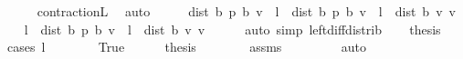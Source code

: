 \begin{isabellebody}
\ \ \ \ \isamarkupfalse%
\ contraction{\isacharunderscore}{\kern0pt}L\ \isamarkupfalse%
\ auto\isanewline
\ \ \isamarkupfalse%
\ \isamarkupfalse%
\ {\isachardoublequoteopen}dist\ {\isacharparenleft}{\kern0pt}{\isasymnu}\isactrlsub b\ {\isacharquery}{\kern0pt}p{\isacharparenright}{\kern0pt}\ {\isacharparenleft}{\kern0pt}{\isasymL}\isactrlsub b\ {\isacharquery}{\kern0pt}v{\isacharparenright}{\kern0pt}\ {\isasymle}\ l\ {\isacharasterisk}{\kern0pt}\ dist\ {\isacharparenleft}{\kern0pt}{\isasymnu}\isactrlsub b\ {\isacharquery}{\kern0pt}p{\isacharparenright}{\kern0pt}\ {\isacharparenleft}{\kern0pt}{\isasymL}\isactrlsub b\ {\isacharquery}{\kern0pt}v{\isacharparenright}{\kern0pt}\ {\isacharplus}{\kern0pt}\ l\ {\isacharasterisk}{\kern0pt}\ dist\ {\isacharparenleft}{\kern0pt}{\isasymL}\isactrlsub b\ {\isacharquery}{\kern0pt}v{\isacharparenright}{\kern0pt}\ {\isacharquery}{\kern0pt}v{\isachardoublequoteclose}\isacommand{{\isachardot}{\kern0pt}}\isamarkupfalse%
\isanewline
\ \ \isamarkupfalse%
\ {\isacharasterisk}{\kern0pt}{\isacharcolon}{\kern0pt}{\isachardoublequoteopen}{\isacharparenleft}{\kern0pt}{}{\isacharminus}{\kern0pt}l{\isacharparenright}{\kern0pt}\ {\isacharasterisk}{\kern0pt}\ dist\ {\isacharparenleft}{\kern0pt}{\isasymnu}\isactrlsub b\ {\isacharquery}{\kern0pt}p{\isacharparenright}{\kern0pt}\ {\isacharparenleft}{\kern0pt}{\isasymL}\isactrlsub b\ {\isacharquery}{\kern0pt}v{\isacharparenright}{\kern0pt}\ {\isasymle}\ l\ {\isacharasterisk}{\kern0pt}\ dist\ {\isacharparenleft}{\kern0pt}{\isasymL}\isactrlsub b\ {\isacharquery}{\kern0pt}v{\isacharparenright}{\kern0pt}\ {\isacharquery}{\kern0pt}v{\isachardoublequoteclose}\isanewline
\ \ \ \ \isamarkupfalse%
\ {\isacharparenleft}{\kern0pt}auto\ simp{\isacharcolon}{\kern0pt}\ left{\isacharunderscore}{\kern0pt}diff{\isacharunderscore}{\kern0pt}distrib{\isacharparenright}{\kern0pt}\isanewline
\ \ \isamarkupfalse%
\ {\isacharquery}{\kern0pt}thesis\isanewline
\ \ \isamarkupfalse%
\ {\isacharparenleft}{\kern0pt}cases\ {\isachardoublequoteopen}l\ {\isacharequal}{\kern0pt}\ {}{\isachardoublequoteclose}{\isacharparenright}{\kern0pt}\isanewline
\ \ \ \ \isamarkupfalse%
\ True\isanewline
\ \ \ \ \isamarkupfalse%
\ {\isacharquery}{\kern0pt}thesis\isanewline
\ \ \ \ \ \ \isamarkupfalse%
\ assms\ {\isacharasterisk}{\kern0pt}\isanewline
\ \ \ \ \ \ \isamarkupfalse%
\ auto\isanewline
\ \ \isamarkupfalse%

\end{isabellebody}
